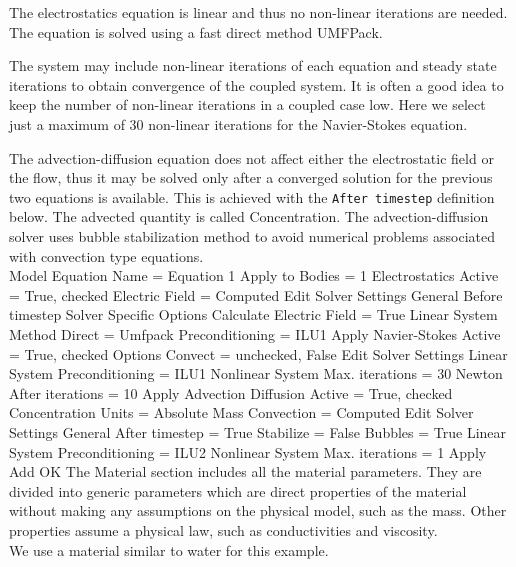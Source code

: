 The electrostatics equation is linear and thus no non-linear iterations are needed. The equation is solved using a fast direct method UMFPack.

The system may include non-linear iterations of each equation and steady state iterations to obtain convergence of the coupled system. It is often a good idea to keep the number of non-linear iterations in a coupled case low.  Here we select just  a maximum of 30 non-linear iterations for the Navier-Stokes equation.

The advection-diffusion equation does not affect either the electrostatic field or the flow, thus it may be solved only after a converged solution for the previous two equations is available. This is achieved with the \texttt{After timestep} definition below. The advected quantity is called Concentration.  The advection-diffusion solver uses bubble stabilization method to avoid numerical problems associated with convection type equations.\\

\ttbegin
Model
  Equation
   Name = Equation 1
    Apply to Bodies = 1
    Electrostatics
      Active = True, checked
      Electric Field = Computed
      Edit Solver Settings
      General
        Before timestep
      Solver Specific Options
        Calculate Electric Field = True
      Linear System
        Method
          Direct = Umfpack
        Preconditioning = ILU1
     Apply
     Navier-Stokes
       Active = True, checked
       Options
         Convect = unchecked, False
      Edit Solver Settings
       Linear System
         Preconditioning = ILU1
       Nonlinear System
         Max. iterations = 30
         Newton
           After iterations = 10
     Apply
     Advection Diffusion
        Active = True, checked
        Concentration Units = Absolute Mass
        Convection = Computed
      Edit Solver Settings
       General
         After timestep = True
         Stabilize = False
         Bubbles = True
       Linear System
         Preconditioning = ILU2
       Nonlinear System
         Max. iterations = 1
     Apply
    Add
    OK
\ttend        
The Material section includes all the material parameters. They are divided into generic parameters which are direct properties of the material without making any assumptions on the physical model, such as the mass. Other properties assume a physical law, such as conductivities and viscosity. \\

We use a material similar to water for this example.

